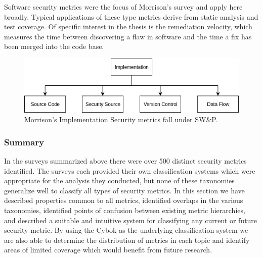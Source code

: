 Software security metrics were the focus of Morrison’s survey and apply here broadly. Typical applications of these type metrics derive from static analysis and test coverage. Of specific interest in the thesis is the remediation velocity, which measures the time between discovering a flaw in software and the time a fix has been merged into the code base.


\begin{figure}[ht]
\centering
\includegraphics[width=.85\linewidth]{resource/img/ch_background/cybok_metrics/morrison_implementation.png}
\centering
\caption{Morrison’s Implementation Security metrics fall under SW\&P.
\label{fig:background:cybok_ad_vaugh_ttoa}}
\end{figure} 


\subsubsection{Summary}

In the surveys summarized above there were over 500 distinct security metrics identified. The surveys each provided their own classification systems which were appropriate for the analysis they conducted, but none of these taxonomies generalize well to classify all types of security metrics. In this section we have described properties common to all metrics, identified overlaps in the various taxonomies, identified points of confusion between existing metric hierarchies, and described a suitable and intuitive system for classifying any current or future security metric. By using the Cybok as the underlying classification system we are also able to determine the distribution of metrics in each topic and identify areas of limited coverage which would benefit from future research.







